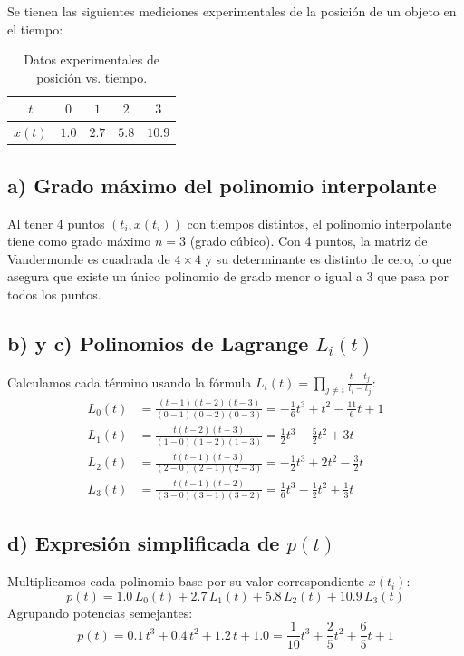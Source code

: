 \documentclass[11pt,a4paper]{article}
\begin{document}
Se tienen las siguientes mediciones experimentales de la posición de un objeto en el tiempo:

\begin{table}[h!]
    \centering
    \caption{Datos experimentales de posición vs. tiempo.}
    \begin{tabular}{ccccc}
        \toprule
        $t$ & $0$ & $1$ & $2$ & $3$ \\
        \midrule
        $x(t)$ & $1.0$ & $2.7$ & $5.8$ & $10.9$ \\
        \bottomrule
    \end{tabular}
\end{table}

\subsection{a) Grado máximo del polinomio interpolante}
Al tener 4 puntos $(t_i, x(t_i))$ con tiempos distintos, el polinomio interpolante tiene como grado máximo $n = 3$ (grado cúbico). Con 4 puntos, la matriz de Vandermonde es cuadrada de $4 \times 4$ y su determinante es distinto de cero, lo que asegura que existe un único polinomio de grado menor o igual a 3 que pasa por todos los puntos.

\subsection{b) y c) Polinomios de Lagrange $L_i(t)$}
Calculamos cada término usando la fórmula $L_i(t) = \prod_{j \neq i} \frac{t - t_j}{t_i - t_j}$:
\begin{align*}
    L_0(t) &= \frac{(t-1)(t-2)(t-3)}{(0-1)(0-2)(0-3)} = -\frac{1}{6}t^3 + t^2 - \frac{11}{6}t + 1 \\
    L_1(t) &= \frac{t(t-2)(t-3)}{(1-0)(1-2)(1-3)} = \frac{1}{2}t^3 - \frac{5}{2}t^2 + 3t \\
    L_2(t) &= \frac{t(t-1)(t-3)}{(2-0)(2-1)(2-3)} = -\frac{1}{2}t^3 + 2t^2 - \frac{3}{2}t \\
    L_3(t) &= \frac{t(t-1)(t-2)}{(3-0)(3-1)(3-2)} = \frac{1}{6}t^3 - \frac{1}{2}t^2 + \frac{1}{3}t
\end{align*}

\subsection{d) Expresión simplificada de $p(t)$}
Multiplicamos cada polinomio base por su valor correspondiente $x(t_i)$:
\begin{equation}
    p(t) = 1.0\,L_0(t) + 2.7\,L_1(t) + 5.8\,L_2(t) + 10.9\,L_3(t)
\end{equation}
Agrupando potencias semejantes:
\begin{equation}
    p(t) = 0.1\,t^3 + 0.4\,t^2 + 1.2\,t + 1.0 = \frac{1}{10}t^3 + \frac{2}{5}t^2 + \frac{6}{5}t + 1
\end{equation}
\end{document}
